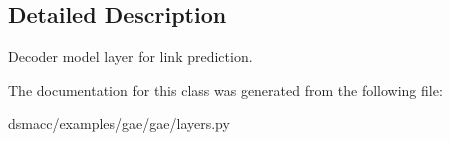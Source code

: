 \subsection{Detailed Description}
\begin{DoxyVerb}Decoder model layer for link prediction.\end{DoxyVerb}
 

The documentation for this class was generated from the following file\+:\begin{DoxyCompactItemize}
\item 
dsmacc/examples/gae/gae/layers.\+py\end{DoxyCompactItemize}
